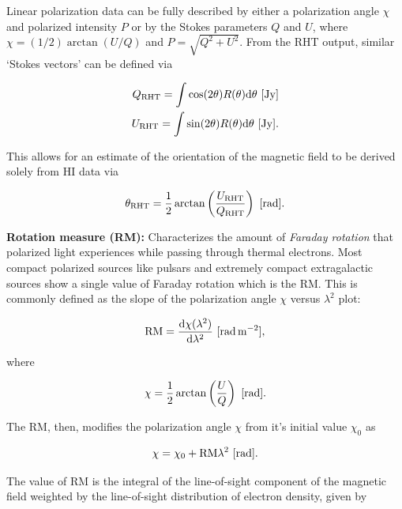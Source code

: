 \documentclass[a4paper,10pt]{article}
\begin{document}
{\noindent}Linear polarization data can be fully described by either
a polarization angle $\chi$ and polarized intensity $P$ or by the Stokes parameters $Q$ and $U$, where $\chi=(1/2)\arctan(U/Q)$ and $P=\sqrt{Q^2+U^2}$. From the RHT output, similar `Stokes vectors' can be defined via

\begin{align*}
    Q_\mathrm{RHT} = \int\cos(2\theta)R(\theta)\mathrm{d}\theta ~ [{\rm Jy}] \\
    U_\mathrm{RHT} = \int\sin(2\theta)R(\theta)\mathrm{d}\theta ~ [{\rm Jy}].
\end{align*}

{\noindent}This allows for an estimate of the orientation of the magnetic field to be derived solely from HI data via

\begin{align*}
    \theta_\mathrm{RHT} = \frac{1}{2}\arctan\left(\frac{U_\mathrm{RHT}}{Q_\mathrm{RHT}}\right) ~ [{\rm rad}].
\end{align*}

{\noindent}\textbf{Rotation measure (RM):} Characterizes the amount of \textit{Faraday rotation} that polarized light experiences while passing through thermal electrons. Most compact polarized sources like pulsars and extremely compact extragalactic sources show a single value of Faraday rotation which is the RM. This is commonly defined as the slope of the polarization angle $\chi$ versus $\lambda^2$ plot:

\begin{align*}
    {\rm RM} = \frac{\mathrm{d}\chi(\lambda^2)}{\mathrm{d}\lambda^2} ~ [{\rm rad\,m^{-2}}],
\end{align*}

{\noindent}where

\begin{align*}
    \chi = \frac{1}{2}\arctan\left(\frac{U}{Q}\right) ~ [{\rm rad}].
\end{align*}

{\noindent}The RM, then, modifies the polarization angle $\chi$ from it's initial value $\chi_0$ as 

\begin{align*}
    \chi = \chi_0 + \mathrm{RM}\lambda^2 ~ [{\rm rad}].
\end{align*}

{\noindent}The value of $\mathrm{RM}$ is the integral of the line-of-sight component of the magnetic field weighted by the line-of-sight distribution of electron density, given by
\end{document}
